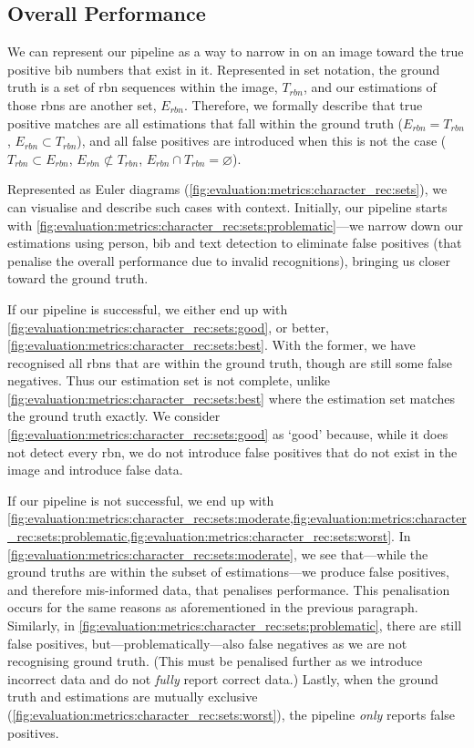 \subsection{Overall Performance}
\label{sec:evaluation:metrics:overall}

We can represent our pipeline as a way to narrow in on an image toward the true positive bib numbers that exist in it. Represented in set notation, the ground truth is a set of \gls{rbn} sequences within the image, $T_{rbn}$, and our estimations of those \glspl{rbn} are another set, $E_{rbn}$. Therefore, we formally describe that true positive matches are all estimations that fall within the ground truth ($E_{rbn} = T_{rbn}$, $E_{rbn} \subset T_{rbn}$), and all false positives are introduced when this is not the case ($T_{rbn} \subset E_{rbn}$, $E_{rbn} \not\subset T_{rbn}$,  $E_{rbn} \cap T_{rbn} = \varnothing$).

Represented as Euler diagrams (\cref{fig:evaluation:metrics:character_rec:sets}), we can visualise and describe such cases with context. Initially, our pipeline starts with \cref{fig:evaluation:metrics:character_rec:sets:problematic}---we narrow down our estimations using person, bib and text detection to eliminate false positives (that penalise the overall performance due to invalid recognitions), bringing us closer toward the ground truth.

If our pipeline is successful, we either end up with \cref{fig:evaluation:metrics:character_rec:sets:good}, or better, \cref{fig:evaluation:metrics:character_rec:sets:best}. With the former, we have recognised all \glspl{rbn} that are within the ground truth, though are still some false negatives. Thus our estimation set is not complete, unlike \cref{fig:evaluation:metrics:character_rec:sets:best} where the estimation set matches the ground truth exactly. We consider \cref{fig:evaluation:metrics:character_rec:sets:good} as `good' because, while it does not detect every \gls{rbn}, we do not introduce false positives that do not exist in the image and introduce false data.

If our pipeline is not successful, we end up with \cref{fig:evaluation:metrics:character_rec:sets:moderate,fig:evaluation:metrics:character_rec:sets:problematic,fig:evaluation:metrics:character_rec:sets:worst}. In  \cref{fig:evaluation:metrics:character_rec:sets:moderate}, we see that---while the ground truths are within the subset of estimations---we produce false positives, and therefore mis-informed data, that penalises performance. This penalisation occurs for the same reasons as aforementioned in the previous paragraph. Similarly, in \cref{fig:evaluation:metrics:character_rec:sets:problematic}, there are still false positives, but---problematically---also false negatives as we are not recognising ground truth. (This must be penalised further as we introduce incorrect data and do not \textit{fully} report correct data.) Lastly, when the ground truth and estimations are mutually exclusive (\cref{fig:evaluation:metrics:character_rec:sets:worst}), the pipeline \textit{only} reports false positives.

